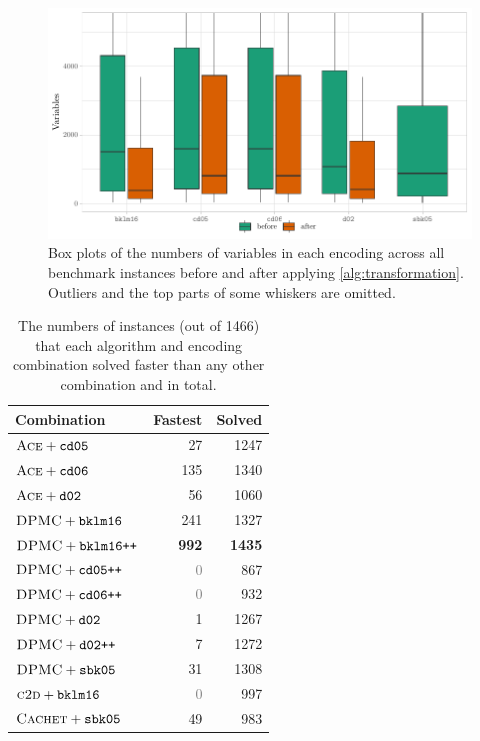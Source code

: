 \begin{figure}[t]
  \centering
  \includegraphics[width=\textwidth]{chapters/wmc_without_parameters/box}
  \caption{Box plots of the numbers of variables in each encoding across all
    benchmark instances before and after applying \cref{alg:transformation}.
    Outliers and the top parts of some whiskers are omitted.}\label{fig:box}
\end{figure}

\begin{table}[t]
  \centering
  \begin{tabular}{lrr}
    \toprule
    Combination & Fastest & Solved \\
    \midrule
    $\textsc{Ace} + \texttt{cd05}$ & 27 & 1247 \\
    $\textsc{Ace} + \texttt{cd06}$ & 135 & 1340 \\
    $\textsc{Ace} + \texttt{d02}$ & 56 & 1060 \\
    $\textsc{DPMC} + \texttt{bklm16}$ & 241 & 1327 \\
    $\textsc{DPMC} + \texttt{bklm16++}$ & \textbf{992} & \textbf{1435} \\
    $\textsc{DPMC} + \texttt{cd05++}$ & \textcolor{gray}{0} & 867 \\
    $\textsc{DPMC} + \texttt{cd06++}$ & \textcolor{gray}{0} & 932 \\
    $\textsc{DPMC} + \texttt{d02}$ & 1 & 1267 \\
    $\textsc{DPMC} + \texttt{d02++}$ & 7 & 1272 \\
    $\textsc{DPMC} + \texttt{sbk05}$ & 31 & 1308 \\
    $\textsc{c2d} + \texttt{bklm16}$ & \textcolor{gray}{0} & 997 \\
    $\textsc{Cachet} + \texttt{sbk05}$ & 49 & 983 \\
    \bottomrule
  \end{tabular}
  \caption{The numbers of instances (out of 1466) that each algorithm and
    encoding combination solved faster than any other combination and in
    total.}\label{tbl:performance}
\end{table}

